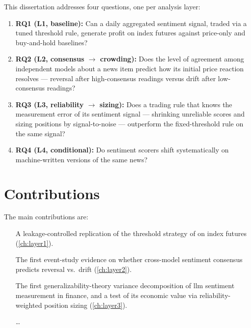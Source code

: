 This dissertation addresses four questions, one per analysis layer:
\begin{enumerate}
  \item \textbf{RQ1 (L1, baseline):} Can a daily aggregated sentiment
        signal, traded via a tuned threshold rule, generate profit on
        index futures against price-only and buy-and-hold baselines?
  \item \textbf{RQ2 (L2, consensus $\to$ crowding):} Does the level of
        agreement among independent models about a news item predict
        how its initial price reaction resolves --- reversal after
        high-consensus readings versus drift after low-consensus
        readings?
  \item \textbf{RQ3 (L3, reliability $\to$ sizing):} Does a trading
        rule that knows the measurement error of its sentiment signal
        --- shrinking unreliable scores and sizing positions by
        signal-to-noise --- outperform the fixed-threshold rule on the
        same signal?
  \item \textbf{RQ4 (L4, conditional):} Do sentiment scorers shift
        systematically on machine-written versions of the same news?
\end{enumerate}

\section{Contributions}
\label{sec:contributions}

The main contributions are:
\begin{itemize}
  \item [A leakage-controlled replication of the threshold strategy of
        \textcite{mitic2026llm} on index futures (\cref{ch:layer1}).]
  \item [The first event-study evidence on whether cross-model
        sentiment consensus predicts reversal vs.\ drift
        (\cref{ch:layer2}).]
  \item [The first generalizability-theory variance decomposition of
        \gls{llm} sentiment measurement in finance, and a test of its
        economic value via reliability-weighted position sizing
        (\cref{ch:layer3}).]
  \item [\dots]
\end{itemize}

